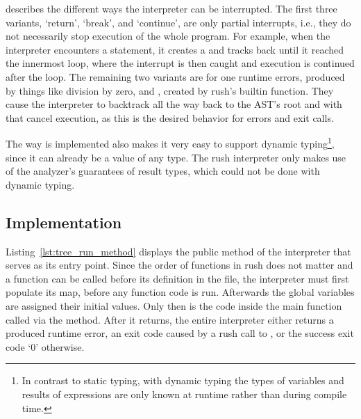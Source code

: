  describes the different ways the interpreter can be interrupted.
The first three variants, `return', `break', and `continue', are only partial interrupts, i.e., they do not necessarily stop execution of the whole program.
For example, when the interpreter encounters a  statement, it creates a  and tracks back until it reached the innermost loop, where the interrupt is then caught and execution is continued after the loop.
The remaining two variants are for one runtime errors, produced by things like division by zero, and , created by rush's builtin  function.
They cause the interpreter to backtrack all the way back to the AST's root and with that cancel execution, as this is the desired behavior for errors and exit calls.

The way  is implemented also makes it very easy to support dynamic typing\footnote{In contrast to static typing, with dynamic typing the types of variables and results of expressions are only known at runtime rather than during compile time.}, since it can already be a value of any type.
The rush interpreter only makes use of the analyzer's guarantees of result types, which could not be done with dynamic typing.

\subsection{Implementation}


Listing~\ref{lst:tree_run_method} displays the public  method of the interpreter that serves as its entry point.
Since the order of functions in rush does not matter and a function can be called before its definition in the file, the interpreter must first populate its  map, before any function code is run.
Afterwards the global variables are assigned their initial values.
Only then is the code inside the main function called via the  method.
After it returns, the entire interpreter either returns a produced runtime error, an exit code caused by a rush call to , or the success exit code `0' otherwise.


